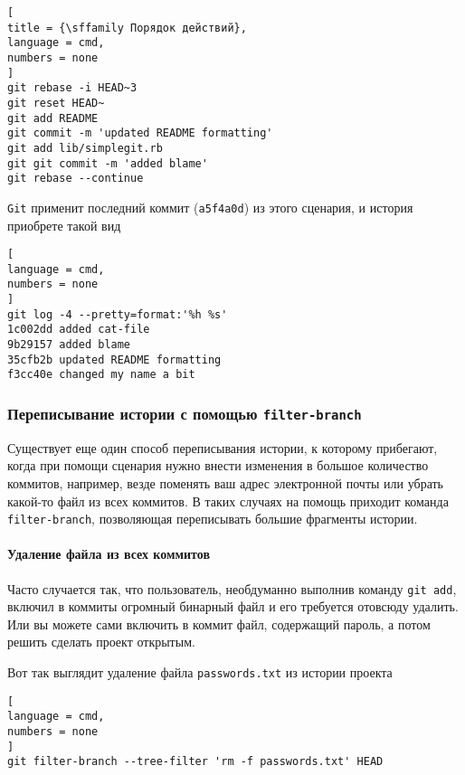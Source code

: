 \documentclass[%
	11pt,
	a4paper,
	utf8,
		]{article}
\begin{document}
\begin{lstlisting}[
title = {\sffamily Порядок действий},
language = cmd,
numbers = none
]
git rebase -i HEAD~3
git reset HEAD~
git add README
git commit -m 'updated README formatting'
git add lib/simplegit.rb
git git commit -m 'added blame'
git rebase --continue
\end{lstlisting}

\texttt{Git} применит последний коммит (\texttt{a5f4a0d}) из этого сценария, и история приобрете такой вид

\begin{lstlisting}[
language = cmd,
numbers = none
]
git log -4 --pretty=format:'%h %s'
1c002dd added cat-file
9b29157 added blame
35cfb2b updated README formatting
f3cc40e changed my name a bit
\end{lstlisting}


\subsubsection{Переписывание истории с помощью \texttt{filter-branch}}

Существует еще один способ переписывания истории, к которому прибегают, когда при помощи сценария нужно внести изменения в большое количество коммитов, например, везде поменять ваш адрес электронной почты или убрать какой-то файл из всех коммитов. В таких случаях на помощь приходит команда \lstinline{filter-branch}, позволяющая переписывать большие фрагменты истории.

\paragraph{Удаление файла из всех коммитов} Часто случается так, что пользователь, необдуманно выполнив команду \texttt{git add}, включил в коммиты огромный бинарный файл и его требуется отовсюду удалить. Или вы можете сами включить в коммит файл, содержащий пароль, а потом решить сделать проект открытым.

Вот так выглядит удаление файла \texttt{passwords.txt} из истории проекта

\begin{lstlisting}[
language = cmd,
numbers = none
]
git filter-branch --tree-filter 'rm -f passwords.txt' HEAD
\end{lstlisting}
\end{document}
